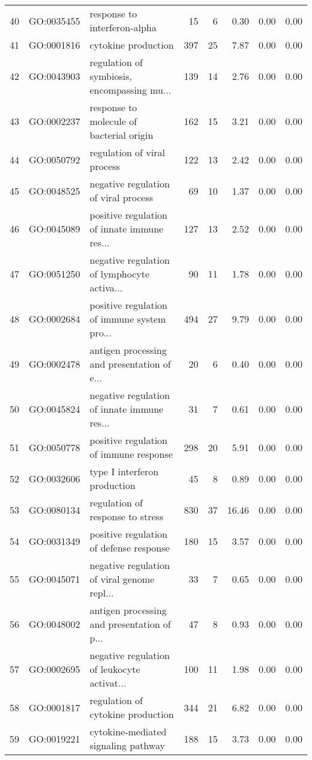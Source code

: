\begin{table}[ht]
\begin{tabular}{rllrrrrr}
  40 & GO:0035455 & response to interferon-alpha &  15 &   6 & 0.30 & 0.00 & 0.00 \\ 
  41 & GO:0001816 & cytokine production & 397 &  25 & 7.87 & 0.00 & 0.00 \\ 
  42 & GO:0043903 & regulation of symbiosis, encompassing mu... & 139 &  14 & 2.76 & 0.00 & 0.00 \\ 
  43 & GO:0002237 & response to molecule of bacterial origin & 162 &  15 & 3.21 & 0.00 & 0.00 \\ 
  44 & GO:0050792 & regulation of viral process & 122 &  13 & 2.42 & 0.00 & 0.00 \\ 
  45 & GO:0048525 & negative regulation of viral process &  69 &  10 & 1.37 & 0.00 & 0.00 \\ 
  46 & GO:0045089 & positive regulation of innate immune res... & 127 &  13 & 2.52 & 0.00 & 0.00 \\ 
  47 & GO:0051250 & negative regulation of lymphocyte activa... &  90 &  11 & 1.78 & 0.00 & 0.00 \\ 
  48 & GO:0002684 & positive regulation of immune system pro... & 494 &  27 & 9.79 & 0.00 & 0.00 \\ 
  49 & GO:0002478 & antigen processing and presentation of e... &  20 &   6 & 0.40 & 0.00 & 0.00 \\ 
  50 & GO:0045824 & negative regulation of innate immune res... &  31 &   7 & 0.61 & 0.00 & 0.00 \\ 
  51 & GO:0050778 & positive regulation of immune response & 298 &  20 & 5.91 & 0.00 & 0.00 \\ 
  52 & GO:0032606 & type I interferon production &  45 &   8 & 0.89 & 0.00 & 0.00 \\ 
  53 & GO:0080134 & regulation of response to stress & 830 &  37 & 16.46 & 0.00 & 0.00 \\ 
  54 & GO:0031349 & positive regulation of defense response & 180 &  15 & 3.57 & 0.00 & 0.00 \\ 
  55 & GO:0045071 & negative regulation of viral genome repl... &  33 &   7 & 0.65 & 0.00 & 0.00 \\ 
  56 & GO:0048002 & antigen processing and presentation of p... &  47 &   8 & 0.93 & 0.00 & 0.00 \\ 
  57 & GO:0002695 & negative regulation of leukocyte activat... & 100 &  11 & 1.98 & 0.00 & 0.00 \\ 
  58 & GO:0001817 & regulation of cytokine production & 344 &  21 & 6.82 & 0.00 & 0.00 \\ 
  59 & GO:0019221 & cytokine-mediated signaling pathway & 188 &  15 & 3.73 & 0.00 & 0.00 \\ 

\end{tabular}
\end{table}
